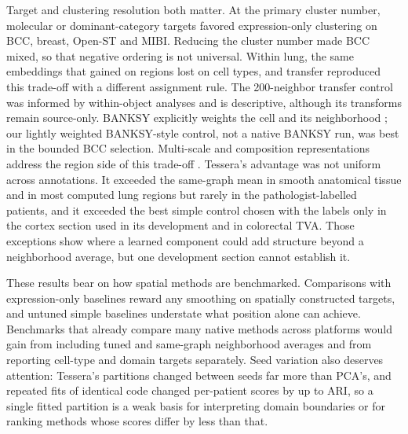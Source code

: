 \documentclass[11pt]{article}
\begin{document}
Target and clustering resolution both matter. At the primary cluster number, molecular or dominant-category targets favored expression-only clustering on BCC, breast, Open-ST and MIBI. Reducing the cluster number made BCC mixed, so that negative ordering is not universal. Within lung, the same embeddings that gained on regions lost on cell types, and transfer reproduced this trade-off with a different assignment rule. The 200-neighbor transfer control was informed by within-object analyses and is descriptive, although its transforms remain source-only. BANKSY explicitly weights the cell and its neighborhood \citep{singhal2024banksy}; our lightly weighted BANKSY-style control, not a native BANKSY run, was best in the bounded BCC selection. Multi-scale and composition representations address the region side of this trade-off \citep{yuan2024mender,liang2026cellniche}. Tessera's advantage was not uniform across annotations. It exceeded the same-graph mean in smooth anatomical tissue and in most computed lung regions but rarely in the pathologist-labelled patients, and it exceeded the best simple control chosen with the labels only in the cortex section used in its development and in colorectal TVA. Those exceptions show where a learned component could add structure beyond a neighborhood average, but one development section cannot establish it.

These results bear on how spatial methods are benchmarked. Comparisons with expression-only baselines reward any smoothing on spatially constructed targets, and untuned simple baselines understate what position alone can achieve. Benchmarks that already compare many native methods across platforms \citep{yuan2024benchmark,kang2025nar,chen2025imeta} would gain from including tuned and same-graph neighborhood averages and from reporting cell-type and domain targets separately. Seed variation also deserves attention: Tessera's partitions changed between seeds far more than PCA's, and repeated fits of identical code changed per-patient scores by up to \RepMaxRange{} ARI, so a single fitted partition is a weak basis for interpreting domain boundaries or for ranking methods whose scores differ by less than that.
\end{document}

